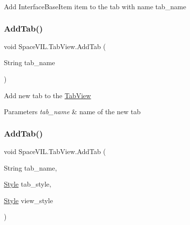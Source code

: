 Add Interface\+Base\+Item item to the tab with name tab\+\_\+name 

\mbox{\label{class_space_v_i_l_1_1_tab_view_a79d231232e2932821229e9837f5bf4f1}} 
\subsubsection{\texorpdfstring{Add\+Tab()}{AddTab()}\hspace{0.1cm}{\footnotesize\ttfamily [1/2]}}
{\footnotesize\ttfamily void Space\+V\+I\+L.\+Tab\+View.\+Add\+Tab (\begin{DoxyParamCaption}\item[{String}]{tab\+\_\+name }\end{DoxyParamCaption})}



Add new tab to the \mbox{\hyperlink{class_space_v_i_l_1_1_tab_view}{Tab\+View}} 


\begin{DoxyParams}{Parameters}
{\em tab\+\_\+name} & name of the new tab \\
\hline
\end{DoxyParams}
\mbox{\label{class_space_v_i_l_1_1_tab_view_a08c96af296bf4e6485deb5def851d904}} 
\subsubsection{\texorpdfstring{Add\+Tab()}{AddTab()}\hspace{0.1cm}{\footnotesize\ttfamily [2/2]}}
{\footnotesize\ttfamily void Space\+V\+I\+L.\+Tab\+View.\+Add\+Tab (\begin{DoxyParamCaption}\item[{String}]{tab\+\_\+name,  }\item[{\mbox{\hyperlink{class_space_v_i_l_1_1_decorations_1_1_style}{Style}}}]{tab\+\_\+style,  }\item[{\mbox{\hyperlink{class_space_v_i_l_1_1_decorations_1_1_style}{Style}}}]{view\+\_\+style }\end{DoxyParamCaption})}



